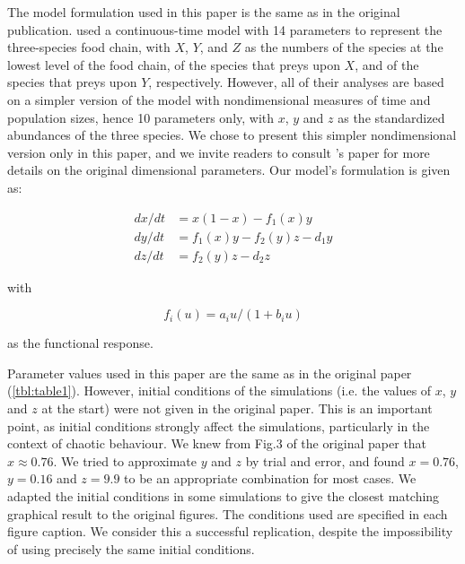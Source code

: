 The model formulation used in this paper is the same as in the original
publication. \citeauthor{hastings1991} used a continuous-time model with 14 parameters to represent the three-species
food chain, with $X$, $Y$, and $Z$ as the numbers of the species at the lowest level of
the food chain, of the species that preys upon $X$, and of the species that preys upon
$Y$, respectively.
However, all of their analyses are based on a simpler version of the model with
nondimensional measures of time and population sizes, hence 10 parameters only, with $x$,
$y$ and $z$ as the standardized abundances of the three species.
We chose to present this simpler nondimensional version only in this paper, and we invite
readers to consult \citeauthor{hastings1991}'s paper for more details on the original dimensional
parameters. Our model's formulation is given as:

\begin{equation} \label{eq:1}
 \begin{aligned} 
    dx/dt &= x(1 - x) - f_1(x)y \\
    dy/dt &= f_1(x)y - f_2(y)z - d_1y \\
    dz/dt &= f_2(y)z - d_2z
 \end{aligned}
\end{equation}

with

\begin{equation} \label{eq:2}
    f_i(u) = a_iu/(1 + b_iu)
\end{equation}

as the functional response.

Parameter values used in this paper are the same as in the original paper
(\autoref{tbl:table1}). However, initial conditions of the simulations (i.e. the values of $x$,
$y$ and $z$ at the start) were not given in the original paper.
This is an important point, as initial conditions strongly affect the simulations,
particularly in the context of chaotic behaviour.
We knew from Fig.3 of the original paper that $x \approx 0.76$.
We tried to approximate $y$ and $z$ by trial and error, and found $x = 0.76$, $y = 0.16$ and
$z = 9.9$ to be an appropriate combination for most cases.
We adapted the initial conditions in some simulations to give the closest matching
graphical result to the original figures.
The conditions used are specified in each figure caption.
We consider this a successful replication, despite the impossibility of using precisely
the same initial conditions.

